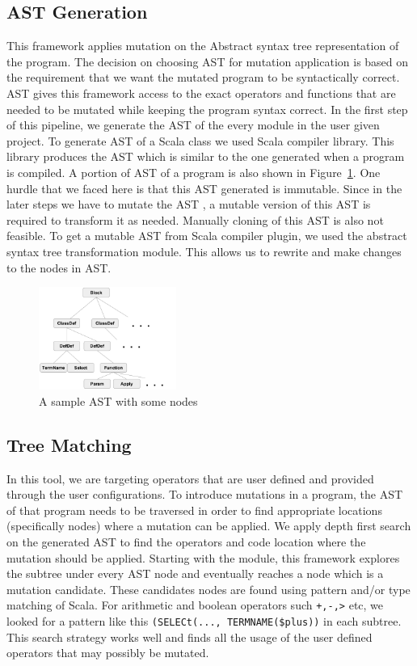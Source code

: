 \subsection{AST Generation}
This framework applies mutation on the Abstract syntax tree representation of the program. The decision on choosing AST for mutation application is based on the requirement that we want the mutated program to be syntactically correct. AST gives this framework access to the exact operators and functions that are needed to be mutated while keeping the program syntax correct. 
In the first step of this pipeline, we generate the AST of the every module in the user given project. To generate AST of  a Scala class we used Scala compiler library. This library produces the AST which is similar to the one generated when a program is compiled. A portion of  AST of a program is also shown in Figure~\ref{ast}.  One hurdle that we faced here is that this AST generated is immutable. Since in the later steps we have to mutate the AST , a mutable version of this AST is required to transform it as needed. Manually cloning of this AST is also not feasible. To get a mutable AST from Scala compiler plugin, we used the  abstract syntax tree transformation module. This allows us to rewrite and make changes to the nodes in AST. 

\begin{figure}[H]
\centering
\includegraphics[width=0.4\textwidth]{image/ast}
 \caption{A sample AST with some nodes }
        \label{ast}
\end{figure}


\subsection{Tree Matching}
In this tool, we are targeting operators that are user defined and provided through the user configurations. To introduce mutations in a program, the AST of that program needs to be traversed in order to find appropriate locations (specifically nodes) where a mutation can be applied. We apply depth first search on the generated AST to find the operators and code location where the mutation should be applied. Starting with the module, this framework explores the subtree under every AST node and eventually reaches a node which is a mutation candidate. These candidates nodes are found using pattern and/or type matching of Scala. For arithmetic and boolean operators such  \texttt{+,-,>} etc, we looked for a pattern like this 
 \texttt{(SELECt(..., TERMNAME(\$plus))}  in each subtree. This search strategy works well and finds all the usage of the user defined operators that may possibly be mutated.


